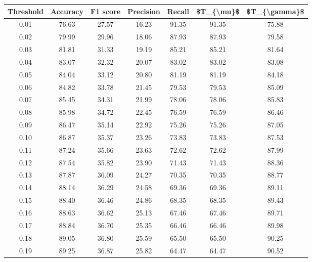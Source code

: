 \begin{tabular}{|c|c|c|c|c|c|c|}
\hline
 Threshold &  Accuracy &  F1 score &  Precision &  Recall &  \$T\_\{\textbackslash mu\}\$ &  \$T\_\{\textbackslash gamma\}\$ \\
\hline
      0.01 &     76.63 &     27.57 &      16.23 &   91.35 &      91.35 &         75.88 \\
      0.02 &     79.99 &     29.96 &      18.06 &   87.93 &      87.93 &         79.58 \\
      0.03 &     81.81 &     31.33 &      19.19 &   85.21 &      85.21 &         81.64 \\
      0.04 &     83.07 &     32.32 &      20.07 &   83.02 &      83.02 &         83.08 \\
      0.05 &     84.04 &     33.12 &      20.80 &   81.19 &      81.19 &         84.18 \\
      0.06 &     84.82 &     33.78 &      21.45 &   79.53 &      79.53 &         85.09 \\
      0.07 &     85.45 &     34.31 &      21.99 &   78.06 &      78.06 &         85.83 \\
      0.08 &     85.98 &     34.72 &      22.45 &   76.59 &      76.59 &         86.46 \\
      0.09 &     86.47 &     35.14 &      22.92 &   75.26 &      75.26 &         87.05 \\
      0.10 &     86.87 &     35.37 &      23.26 &   73.83 &      73.83 &         87.53 \\
      0.11 &     87.24 &     35.66 &      23.63 &   72.62 &      72.62 &         87.99 \\
      0.12 &     87.54 &     35.82 &      23.90 &   71.43 &      71.43 &         88.36 \\
      0.13 &     87.87 &     36.09 &      24.27 &   70.35 &      70.35 &         88.77 \\
      0.14 &     88.14 &     36.29 &      24.58 &   69.36 &      69.36 &         89.11 \\
      0.15 &     88.40 &     36.46 &      24.86 &   68.35 &      68.35 &         89.43 \\
      0.16 &     88.63 &     36.62 &      25.13 &   67.46 &      67.46 &         89.71 \\
      0.17 &     88.84 &     36.70 &      25.35 &   66.46 &      66.46 &         89.98 \\
      0.18 &     89.05 &     36.80 &      25.59 &   65.50 &      65.50 &         90.25 \\
      0.19 &     89.25 &     36.87 &      25.82 &   64.47 &      64.47 &         90.52 \\

\end{tabular}
